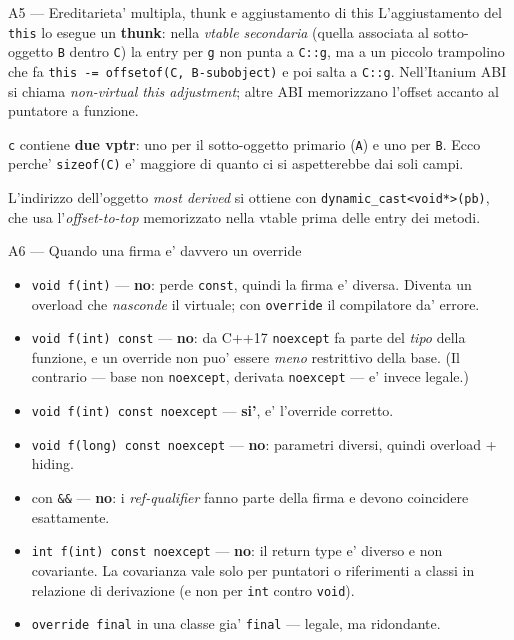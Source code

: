 \documentclass{report}
\newcommand{\code}[1]{\texttt{\small #1}}
\begin{document}
\begin{soluzione}{A5 --- Ereditarieta' multipla, thunk e aggiustamento di this}
\label{sol:A5}
L'aggiustamento del \code{this} lo esegue un \textbf{thunk}: nella
\emph{vtable secondaria} (quella associata al sotto-oggetto \code{B} dentro
\code{C}) la entry per \code{g} non punta a \code{C::g}, ma a un piccolo
trampolino che fa \code{this -= offsetof(C, B-subobject)} e poi salta a
\code{C::g}. Nell'Itanium ABI si chiama \emph{non-virtual this adjustment};
altre ABI memorizzano l'offset accanto al puntatore a funzione.

\code{c} contiene \textbf{due vptr}: uno per il sotto-oggetto primario
(\code{A}) e uno per \code{B}. Ecco perche' \code{sizeof(C)} e' maggiore di
quanto ci si aspetterebbe dai soli campi.

L'indirizzo dell'oggetto \emph{most derived} si ottiene con
\code{dynamic\_cast<void*>(pb)}, che usa l'\emph{offset-to-top} memorizzato
nella vtable prima delle entry dei metodi.
\end{soluzione}

\begin{soluzione}{A6 --- Quando una firma e' davvero un override}
\label{sol:A6}
\begin{itemize}
    \item[(a)] \code{void f(int)} --- \textbf{no}: perde \code{const}, quindi
          la firma e' diversa. Diventa un overload che \emph{nasconde} il
          virtuale; con \code{override} il compilatore da' errore.
    \item[(b)] \code{void f(int) const} --- \textbf{no}: da C++17 \code{noexcept}
          fa parte del \emph{tipo} della funzione, e un override non puo' essere
          \emph{meno} restrittivo della base. (Il contrario --- base non
          \code{noexcept}, derivata \code{noexcept} --- e' invece legale.)
    \item[(c)] \code{void f(int) const noexcept} --- \textbf{si'}, e' l'override
          corretto.
    \item[(d)] \code{void f(long) const noexcept} --- \textbf{no}: parametri
          diversi, quindi overload + hiding.
    \item[(e)] con \code{\&\&} --- \textbf{no}: i \emph{ref-qualifier} fanno
          parte della firma e devono coincidere esattamente.
    \item[(f)] \code{int f(int) const noexcept} --- \textbf{no}: il return type
          e' diverso e non covariante. La covarianza vale solo per puntatori o
          riferimenti a classi in relazione di derivazione (e non per
          \code{int} contro \code{void}).
    \item[(g)] \code{override final} in una classe gia' \code{final} ---
          legale, ma ridondante.
\end{itemize}
\end{soluzione}
\end{document}
